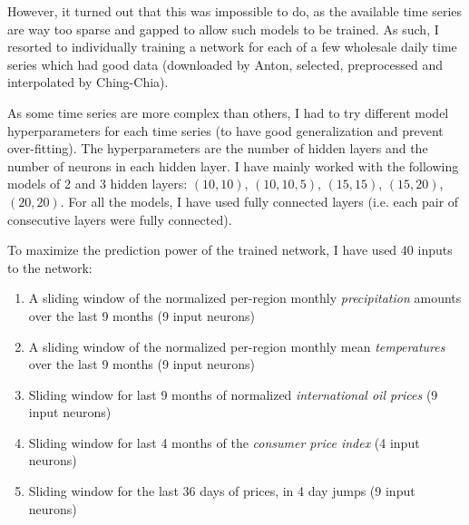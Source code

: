 However, it turned out that this was impossible to do, as the available time
series are way too sparse and gapped to allow such models to be trained.
As such, I resorted to individually training a network for each of a few
wholesale daily time series which had good data (downloaded by Anton, selected,
preprocessed and interpolated by Ching-Chia).

As some time series are more complex than others, I had to try different
model hyperparameters for each time series (to have good generalization and
prevent over-fitting). The hyperparameters are the number
of hidden layers and the number of neurons in each hidden layer. I have mainly
worked with the following models of 2 and 3 hidden layers: $(10, 10)$,
$(10, 10, 5)$, $(15, 15)$, $(15, 20)$, $(20, 20)$. For all the models, I have
used fully connected layers (i.e. each pair of consecutive layers were fully
connected).\pagebreak

To maximize the prediction power of the trained network, I have used $40$
inputs to the network:
\begin{enumerate}
\item A sliding window of the normalized per-region monthly \emph{precipitation} amounts over the last 9 months (9 input neurons)
\item A sliding window of the normalized per-region monthly mean \emph{temperatures} over the last 9 months (9 input neurons)
\item Sliding window for last 9 months of normalized \emph{international oil prices} (9 input neurons)
\item Sliding window for last 4 months of the \emph{consumer price index} (4 input neurons)
\item Sliding window for the last 36 days of prices, in 4 day jumps (9 input neurons)
\end{enumerate}

